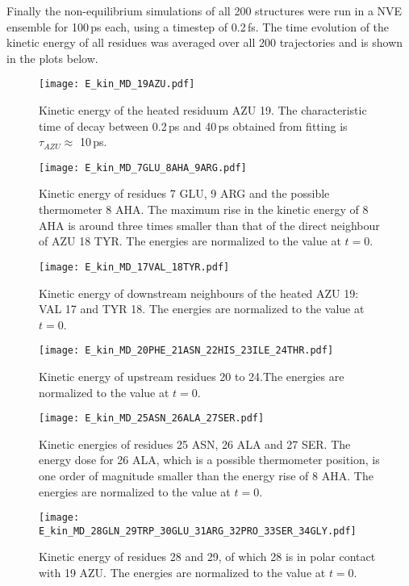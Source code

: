 \documentclass[11pt, a4paper]{report}
\begin{document}
Finally the non-equilibrium simulations of all 200 structures were run in a NVE ensemble for 100\,ps
each, using a timestep of 0.2\,fs. The time evolution of the kinetic energy of
all residues was averaged over all 200 trajectories and is shown in the plots
below.  

\begin{figure}[h]
  \centering
  \texttt{[image: E\_kin\_MD\_19AZU.pdf]}
  \caption{Kinetic energy of the heated residuum AZU 19. The characteristic time
    of decay between 0.2\,ps and 40\,ps obtained from fitting is $\tau_{AZU}
  \approx$ 10\,ps.}
  \label{fig:E_kin_MD_19}
\end{figure}

\begin{figure}[h]
  \centering
  \texttt{[image: E\_kin\_MD\_7GLU\_8AHA\_9ARG.pdf]}
  \caption{Kinetic energy of residues 7 GLU, 9 ARG and the possible thermometer
  8 AHA. The maximum rise in the kinetic energy of 8 AHA is around three times smaller
than that of the direct neighbour of AZU 18 TYR. The energies are normalized to the value at $t=0$. }
  \label{fig:E_kin_MEQ_9ARG_10MET_11SER_12ARG}
\end{figure}

\begin{figure}[h]
  \centering
  \texttt{[image: E\_kin\_MD\_17VAL\_18TYR.pdf]}
  \caption{Kinetic energy of downstream neighbours of the heated AZU 19: VAL 17
  and TYR 18. The energies are normalized to the value at $t=0$.}
  \label{fig:E_kin_MD_15_16_17_18}
\end{figure}

\begin{figure}[h]
  \centering
  \texttt{[image: E\_kin\_MD\_20PHE\_21ASN\_22HIS\_23ILE\_24THR.pdf]}
  \caption{Kinetic energy of upstream residues 20 to 24.The energies are normalized to the value at $t=0$.}
  \label{fig:E_kin_MD_20_21_22_23}
\end{figure}

\begin{figure}[h]
  \centering
  \texttt{[image: E\_kin\_MD\_25ASN\_26ALA\_27SER.pdf]}
  \caption{Kinetic energies of residues 25 ASN, 26 ALA and 27 SER. The energy
  dose for 26 ALA, which is a possible thermometer position, is one order of
magnitude smaller than the energy rise of 8 AHA. The energies are normalized to
the value at $t=0$.}
  \label{fig:name}
\end{figure}

\begin{figure}[h]
  \centering
  \texttt{[image: E\_kin\_MD\_28GLN\_29TRP\_30GLU\_31ARG\_32PRO\_33SER\_34GLY.pdf]}
  \caption{Kinetic energy of residues 28 and 29, of which 28 is in polar contact
  with 19 AZU. The energies are normalized to the value at $t=0$.}
  \label{fig:E_kin_MD_28GLN_29TRP_30GLU_31ARG_32PRO_33SER_34GLY}
\end{figure}

\clearpage

{}

\end{document}
